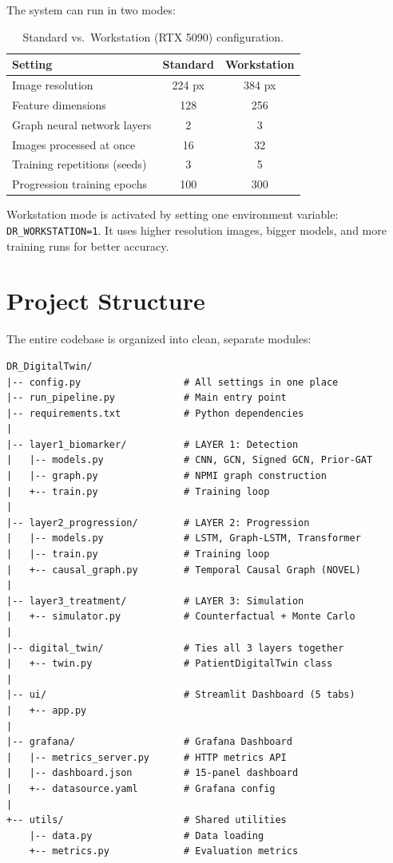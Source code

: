 \documentclass[12pt,a4paper]{article}
\begin{document}
The system can run in two modes:

\begin{table}[H]
\centering
\caption{Standard vs.\ Workstation (RTX 5090) configuration.}
\begin{tabular}{@{}lcc@{}}
\toprule
\textbf{Setting} & \textbf{Standard} & \textbf{Workstation} \\
\midrule
Image resolution & 224 px & 384 px \\
Feature dimensions & 128 & 256 \\
Graph neural network layers & 2 & 3 \\
Images processed at once & 16 & 32 \\
Training repetitions (seeds) & 3 & 5 \\
Progression training epochs & 100 & 300 \\
\bottomrule
\end{tabular}
\end{table}

Workstation mode is activated by setting one environment variable: \texttt{DR\_WORKSTATION=1}. It uses higher resolution images, bigger models, and more training runs for better accuracy.


\section{Project Structure}

The entire codebase is organized into clean, separate modules:

\begin{lstlisting}[basicstyle=\ttfamily\footnotesize,backgroundcolor=\color{codebg}]
DR_DigitalTwin/
|-- config.py                  # All settings in one place
|-- run_pipeline.py            # Main entry point
|-- requirements.txt           # Python dependencies
|
|-- layer1_biomarker/          # LAYER 1: Detection
|   |-- models.py              # CNN, GCN, Signed GCN, Prior-GAT
|   |-- graph.py               # NPMI graph construction
|   +-- train.py               # Training loop
|
|-- layer2_progression/        # LAYER 2: Progression
|   |-- models.py              # LSTM, Graph-LSTM, Transformer
|   |-- train.py               # Training loop
|   +-- causal_graph.py        # Temporal Causal Graph (NOVEL)
|
|-- layer3_treatment/          # LAYER 3: Simulation
|   +-- simulator.py           # Counterfactual + Monte Carlo
|
|-- digital_twin/              # Ties all 3 layers together
|   +-- twin.py                # PatientDigitalTwin class
|
|-- ui/                        # Streamlit Dashboard (5 tabs)
|   +-- app.py
|
|-- grafana/                   # Grafana Dashboard
|   |-- metrics_server.py      # HTTP metrics API
|   |-- dashboard.json         # 15-panel dashboard
|   +-- datasource.yaml        # Grafana config
|
+-- utils/                     # Shared utilities
    |-- data.py                # Data loading
    +-- metrics.py             # Evaluation metrics
\end{lstlisting}
\end{document}
